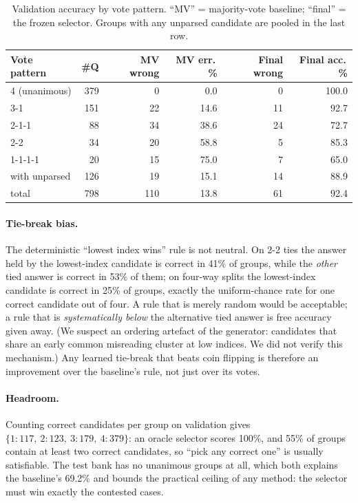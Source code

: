 \documentclass[10pt,a4paper]{article}
\begin{document}
\begin{table}[t]
\centering\small
\caption{Validation accuracy by vote pattern. ``MV'' = majority-vote baseline;
``final'' = the frozen selector. Groups with any unparsed candidate are pooled
in the last row.}
\label{tab:patterns}
\begin{tabular}{lrrrrr}
\hline
Vote pattern & \#Q & MV wrong & MV err.\,\% & Final wrong & Final acc.\,\% \\
\hline
4 (unanimous) & 379 & 0  & 0.0  & 0  & 100.0 \\
3-1           & 151 & 22 & 14.6 & 11 & 92.7 \\
2-1-1         & 88  & 34 & 38.6 & 24 & 72.7 \\
2-2           & 34  & 20 & 58.8 & 5  & 85.3 \\
1-1-1-1       & 20  & 15 & 75.0 & 7  & 65.0 \\
with unparsed & 126 & 19 & 15.1 & 14 & 88.9 \\
\hline
total         & 798 & 110 & 13.8 & 61 & 92.4 \\
\hline
\end{tabular}
\end{table}

\paragraph{Tie-break bias.} The deterministic ``lowest index wins'' rule is not
neutral. On 2-2 ties the answer held by the lowest-index candidate is correct
in 41\% of groups, while the \emph{other} tied answer is correct in 53\% of
them; on four-way splits the lowest-index candidate is correct in 25\% of
groups, exactly the uniform-chance rate for one correct candidate out of four.
A rule that is merely random would be acceptable; a rule that is
\emph{systematically below} the alternative tied answer is free accuracy given
away. (We suspect an ordering artefact of the generator: candidates that share
an early common misreading cluster at low indices. We did not verify this
mechanism.) Any learned tie-break that beats coin flipping is therefore an
improvement over the baseline's rule, not just over its votes.

\paragraph{Headroom.} Counting correct candidates per group on validation
gives $\{1:117,\ 2:123,\ 3:179,\ 4:379\}$: an oracle selector scores 100\%,
and 55\% of groups contain at least two correct candidates, so ``pick any
correct one'' is usually satisfiable. The test bank has no unanimous groups at
all, which both explains the baseline's 69.2\% and bounds the practical
ceiling of any method: the selector must win exactly the contested cases.
\end{document}
